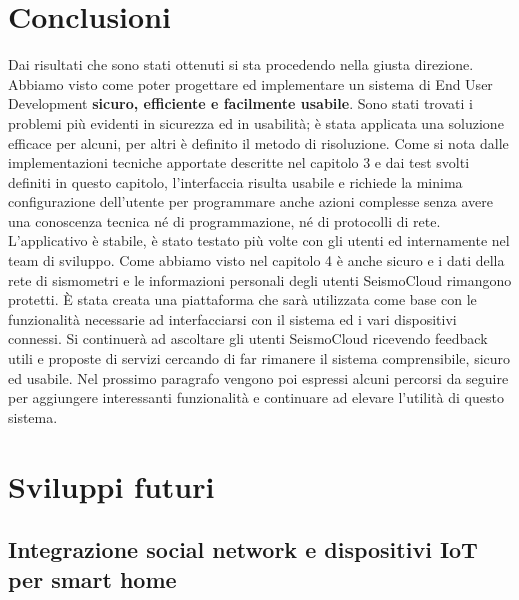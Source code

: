 \documentclass[a4paper,10pt]{memoir}
\begin{document}
\section{Conclusioni}

Dai risultati che sono stati ottenuti si sta procedendo nella giusta direzione.
Abbiamo visto come poter progettare ed implementare un sistema di End User Development \textbf{sicuro, efficiente e facilmente usabile}.
Sono stati trovati i problemi più evidenti in sicurezza ed in usabilità; è stata applicata una soluzione efficace per alcuni, per altri è definito il metodo di risoluzione.
Come si nota dalle implementazioni tecniche apportate descritte nel capitolo 3 e dai test svolti definiti in questo capitolo, l'interfaccia risulta usabile e richiede la minima configurazione dell'utente per programmare anche azioni complesse senza avere una conoscenza tecnica né di programmazione, né di protocolli di rete.
L'applicativo è stabile, è stato testato più volte con gli utenti ed internamente nel team di sviluppo.
Come abbiamo visto nel capitolo 4 è anche sicuro e i dati della rete di sismometri e le informazioni personali degli utenti SeismoCloud rimangono protetti.
È stata creata una piattaforma che sarà utilizzata come base con le funzionalità necessarie ad interfacciarsi con il sistema ed i vari dispositivi connessi.
Si continuerà ad ascoltare gli utenti SeismoCloud ricevendo feedback utili e proposte di servizi cercando di far rimanere il sistema comprensibile, sicuro ed usabile.
Nel prossimo paragrafo vengono poi espressi alcuni percorsi da seguire per aggiungere interessanti funzionalità e continuare ad elevare l'utilità di questo sistema.
\clearpage

\section{Sviluppi futuri}

\subsection{Integrazione social network e dispositivi IoT per smart home}
\end{document}
